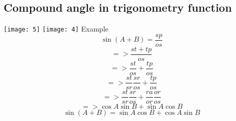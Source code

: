 	\subsection{Compound angle in trigonometry function}
	\texttt{[image: 5]}
	\texttt{[image: 4]}
	\newline
	Example
	\begin{equation}
	\sin(A+B)=\frac{sp}{os}
	\end{equation}
	\begin{displaymath}
	=>\frac{st+tp}{os}
	\end{displaymath}
	\begin{displaymath}
	=>\frac{st}{os}+\frac{tp}{os}
	\end{displaymath}
	\begin{displaymath}
	=>\frac{st}{sr}\frac{sr}{os}+\frac{tp}{os}
	\end{displaymath}
	\begin{displaymath}
	=>\frac{st}{sr}\frac{sr}{os}+\frac{ra}{or}\frac{or}{os}
	\end{displaymath}
	\begin{displaymath}
	=> \cos A\sin B+\sin A\cos B
	\end{displaymath}
	\begin{equation}
	\sin(A+B) = \sin A\cos B+\cos A\sin B
	\end{equation}
	
